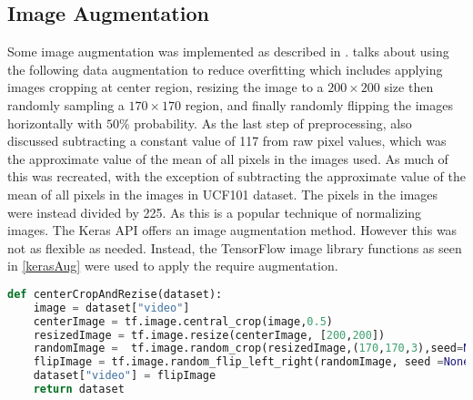 



\subsection{Image Augmentation}
Some image augmentation was implemented as described in \citep{KarpathyCVPR14}. \citep{KarpathyCVPR14} talks about using the following data augmentation to reduce overfitting which includes applying  images cropping at center region, resizing the image to a $200 \times 200$ size then randomly sampling a $170 \times 170$ region, and finally randomly flipping the images horizontally with $50\%$ probability.
As the last step of preprocessing, \citep{KarpathyCVPR14} also discussed subtracting a constant value of 117 from raw pixel values, which was the approximate value of the mean of all pixels in the images used.
As much of this was recreated, with the exception of subtracting the approximate value of the mean of all pixels in the images in UCF101 dataset.  The pixels in the images were instead divided by 225.  As this is a popular technique of normalizing images.
The Keras API offers an image augmentation method. However this was not as flexible as needed. Instead, the TensorFlow image library functions as seen in \ref{kerasAug} were used to apply the require augmentation. 

\begin{lstlisting}[language=Python, caption=keras image augumentation, label=kerasAug]
    def centerCropAndRezise(dataset):
    image = dataset["video"]
    centerImage = tf.image.central_crop(image,0.5)
    resizedImage = tf.image.resize(centerImage, [200,200])
    randomImage =  tf.image.random_crop(resizedImage,(170,170,3),seed=None,name=None)
    flipImage = tf.image.random_flip_left_right(randomImage, seed =None)
    dataset["video"] = flipImage
    return dataset
\end{lstlisting}




